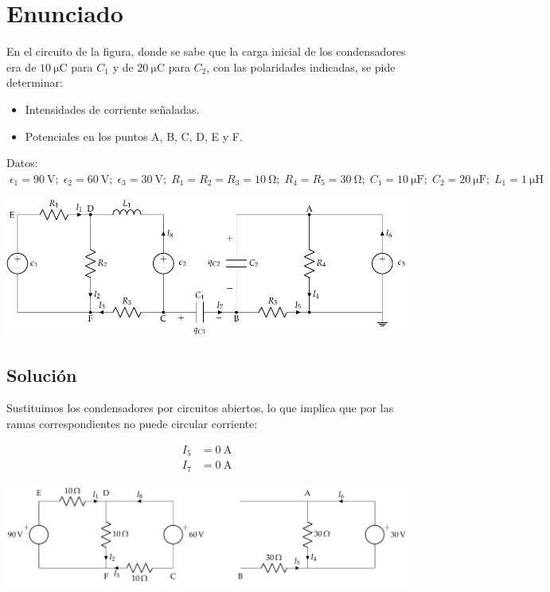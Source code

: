 
\section{Enunciado}

En el circuito de la figura, donde se sabe que la carga inicial de los
condensadores era de $\qty{10}{\micro\coulomb}$ para $C_1$ y de
$\qty{20}{\micro\coulomb}$ para $C_2$, con las polaridades indicadas,
se pide determinar:
\begin{itemize}
\item Intensidades de corriente señaladas.
\item Potenciales en los puntos A, B, C, D, E y F.
\end{itemize}

Datos:
$\; \epsilon_1=\qty{90}{\volt};\; \epsilon_2=\qty{60}{\volt};\;
\epsilon_3=\qty{30}{\volt};\; R_{1}= R_2 = R_3 =
\qty{10}{\ohm};\; R_{4}= R_5 = \qty{30}{\ohm};\; C_{1}=
\qty{10}{\micro\farad};\; C_{2}= \qty{20}{\micro\farad};\; L_1 =
\qty{1}{\micro\henry}$

\begin{center}
  \includegraphics[scale = 0.9]{figuras/mallas_carga_inicial.pdf}
\end{center}


\subsection*{Solución}

Sustituimos los condensadores por circuitos abiertos, lo que implica que por las ramas correspondientes no puede circular corriente:

\vspace{-4mm}
\begin{align*}
  I_5 &= \qty{0}{\ampere}\\
  I_7 &= \qty{0}{\ampere}
\end{align*}

\begin{center}
  \includegraphics[width=\linewidth]{figuras/BT1_10_mod.pdf}
\end{center}

